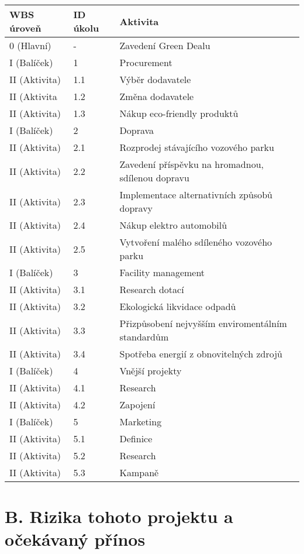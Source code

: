 \begin{table}[]
\begin{tabular}{|l|l|l|}
\hline
WBS úroveň & ID úkolu & Aktivita \\ \hline
0 (Hlavní) & - & Zavedení Green Dealu \\ \hline
\rowcolor[HTML]{C0C0C0} 
I (Balíček) & 1 & Procurement \\ \hline
II (Aktivita) & 1.1 & Výběr dodavatele \\ \hline
II (Aktivita & 1.2 & Změna dodavatele \\ \hline
II (Aktivita) & 1.3 & Nákup eco-friendly produktů \\ \hline
\rowcolor[HTML]{C0C0C0} 
I (Balíček) & 2 & Doprava \\ \hline
II (Aktivita) & 2.1 & Rozprodej stávajícího vozového parku \\ \hline
II (Aktivita) & 2.2 & Zavedení příspěvku na hromadnou, sdílenou dopravu \\ \hline
II (Aktivita) & 2.3 & Implementace alternativních způsobů dopravy \\ \hline
II (Aktivita) & 2.4 & Nákup elektro automobilů \\ \hline
II (Aktivita) & 2.5 & Vytvoření malého sdíleného vozového parku \\ \hline
\rowcolor[HTML]{C0C0C0} 
I (Balíček) & 3 & Facility management \\ \hline
II (Aktivita) & 3.1 & Research dotací \\ \hline
II (Aktivita) & 3.2 & Ekologická likvidace odpadů \\ \hline
II (Aktivita) & 3.3 & Přizpůsobení nejvyšším enviromentálním standardům \\ \hline
II (Aktivita) & 3.4 & Spotřeba energií z obnovitelných zdrojů \\ \hline
\rowcolor[HTML]{C0C0C0} 
I (Balíček) & 4 & Vnější projekty \\ \hline
II (Aktivita) & 4.1 & Research \\ \hline
II (Aktivita) & 4.2 & Zapojení \\ \hline
\rowcolor[HTML]{C0C0C0} 
I (Balíček) & 5 & Marketing \\ \hline
II (Aktivita) & 5.1 & Definice \\ \hline
II (Aktivita) & 5.2 & Research \\ \hline
II (Aktivita) & 5.3 & Kampaně \\ \hline
\end{tabular}
\end{table}


\section*{B. Rizika tohoto projektu a očekávaný přínos}
\label{sec:Rizika tohoto projektu a ocekavany prinos}
